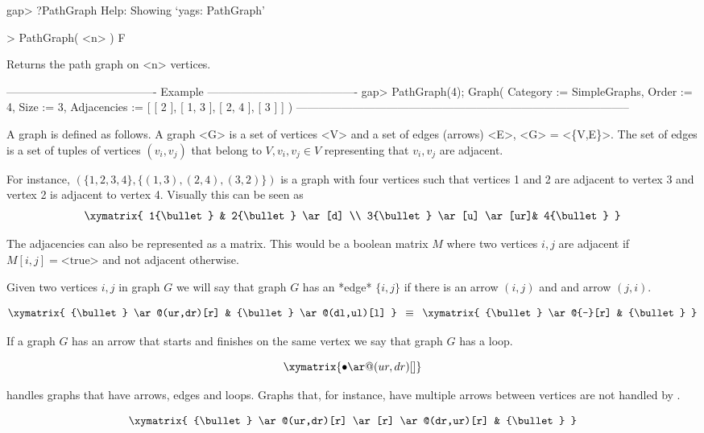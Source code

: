 \beginexample
gap> ?PathGraph
Help: Showing `yags: PathGraph'

> PathGraph( <n> )                                                                      F

Returns the path graph on <n> vertices.

---------------------------------------- Example ----------------------------------------
gap> PathGraph(4);
Graph( Category := SimpleGraphs, Order := 4, Size := 3, Adjacencies :=
[ [ 2 ], [ 1, 3 ], [ 2, 4 ], [ 3 ] ] )
-----------------------------------------------------------------------------------------
\endexample

\endexample

A graph is defined as follows. A graph <G> is a set of vertices <V>
and a set of edges (arrows) <E>, <G> = <\{V,E\}>. The set of edges is
a set of tuples of vertices $(v_i, v_j)$ that belong to $V, v_i, v_j
\in V$ representing that $v_i, v_j$ are adjacent.

For instance, $(\{1,2,3,4\},\{(1,3),(2,4),(3,2)\})$ is a graph with
four vertices such that vertices 1 and 2 are adjacent to vertex
3 and vertex 2 is adjacent to vertex 4. Visually this can be seen as
$$
\xymatrix{
   1{\bullet} & 2{\bullet} \ar[d] \\
   3{\bullet} \ar[u] \ar[ur]& 4{\bullet} 
}  
$$

The adjacencies can also be represented as a matrix. This would be a
boolean matrix $M$ where two vertices $i,j$ are adjacent if
$M[i,j]=\text{<true>}$ and not adjacent otherwise.

Given two vertices $i,j$ in graph $G$ we will say that graph $G$ has an
*edge* $\{i,j\}$ if there is an arrow $(i,j)$ and and arrow $(j,i).$ 

$$
\xymatrix{
   {\bullet} \ar@(ur,dr)[r] & {\bullet} \ar@(dl,ul)[l]
}
\enskip
\equiv 
\enskip
\xymatrix{
   {\bullet} \ar@{-}[r] &  {\bullet}
}
$$

If a graph $G$ has an arrow that starts and finishes on the same
vertex we say that graph $G$ has a loop.

$$
\xymatrix{
   {\bullet} \ar@(ur,dr)[]
} 
$$

{\YAGS} handles graphs that have arrows, edges and loops. Graphs that,
for instance, have multiple arrows between vertices are not handled by
{\YAGS}.

$$
\xymatrix{
   {\bullet} \ar@(ur,dr)[r] \ar[r] \ar@(dr,ur)[r] & {\bullet} 
}
$$


